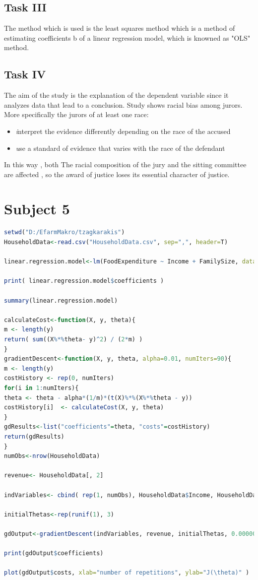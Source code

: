 \documentclass[10pt,a4paper]{article}
\begin{document}
	\subsection{Task III}
The method which is used is the least squares method which is a method of estimating coefficients b of a linear regression model, which is knowned as "OLS" method.\\
	\subsection{Task IV}
The aim of the study is the explanation of the dependent variable since it analyzes data that lead to a conclusion. Study shows racial bias among jurors. More specifically the jurors of at least one race:
	\begin{itemize}
		\item \emph interpret the evidence differently depending on the race of the accused
		\item \emph use a standard of evidence that varies with the race of the defendant
	\end{itemize}
In this way , both The racial composition of the jury and the sitting committee are affected , so the award of justice loses its essential character of justice.
	\newpage
	\section{Subject 5}
	\begin{lstlisting}[language=R]
setwd("D:/EfarmMakro/tzagkarakis")
HouseholdData<-read.csv("HouseholdData.csv", sep=",", header=T)

linear.regression.model<-lm(FoodExpenditure ~ Income + FamilySize, data=HouseholdData)

print( linear.regression.model$coefficients )

summary(linear.regression.model)

calculateCost<-function(X, y, theta){
m <- length(y)
return( sum((X%*%theta- y)^2) / (2*m) )
} 
gradientDescent<-function(X, y, theta, alpha=0.01, numIters=90){
m <- length(y)	
costHistory <- rep(0, numIters)	
for(i in 1:numIters){	
theta <- theta - alpha*(1/m)*(t(X)%*%(X%*%theta - y))	
costHistory[i]  <- calculateCost(X, y, theta)		
} 
gdResults<-list("coefficients"=theta, "costs"=costHistory)
return(gdResults)
} 
numObs<-nrow(HouseholdData)

revenue<- HouseholdData[, 2]

indVariables<- cbind( rep(1, numObs), HouseholdData$Income, HouseholdData$FamilySize ) 

initialThetas<-rep(runif(1), 3) 

gdOutput<-gradientDescent(indVariables, revenue, initialThetas, 0.000000000001, 20000)

print(gdOutput$coefficients)

plot(gdOutput$costs, xlab="number of repetitions", ylab="J(\theta)" )

	
	\end{lstlisting}
	\newpage
	
\end{document}
